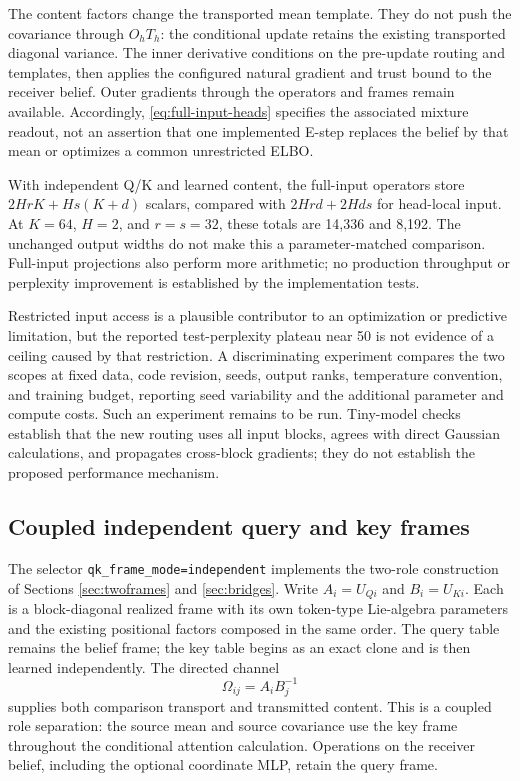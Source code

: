 \documentclass[11pt,letterpaper]{article}
\theoremstyle{remark}
\begin{document}
The content factors change the transported mean template. They do not push the covariance through $O_hT_h$: the conditional update retains the existing transported diagonal variance. The inner derivative conditions on the pre-update routing and templates, then applies the configured natural gradient and trust bound to the receiver belief. Outer gradients through the operators and frames remain available. Accordingly, \eqref{eq:full-input-heads} specifies the associated mixture readout, not an assertion that one implemented E-step replaces the belief by that mean or optimizes a common unrestricted ELBO.

With independent Q/K and learned content, the full-input operators store $2HrK+Hs(K+d)$ scalars, compared with $2Hrd+2Hds$ for head-local input. At $K=64$, $H=2$, and $r=s=32$, these totals are 14,336 and 8,192. The unchanged output widths do not make this a parameter-matched comparison. Full-input projections also perform more arithmetic; no production throughput or perplexity improvement is established by the implementation tests.

Restricted input access is a plausible contributor to an optimization or predictive limitation, but the reported test-perplexity plateau near 50 is not evidence of a ceiling caused by that restriction. A discriminating experiment compares the two scopes at fixed data, code revision, seeds, output ranks, temperature convention, and training budget, reporting seed variability and the additional parameter and compute costs. Such an experiment remains to be run. Tiny-model checks establish that the new routing uses all input blocks, agrees with direct Gaussian calculations, and propagates cross-block gradients; they do not establish the proposed performance mechanism.


\subsection{Coupled independent query and key frames}
\label{sec:implemented-role-frames}
The selector \texttt{qk\_frame\_mode=independent} implements the two-role construction of Sections \ref{sec:twoframes} and \ref{sec:bridges}. Write $A_i=U_{Qi}$ and $B_i=U_{Ki}$. Each is a block-diagonal realized frame with its own token-type Lie-algebra parameters and the existing positional factors composed in the same order. The query table remains the belief frame; the key table begins as an exact clone and is then learned independently. The directed channel
\begin{equation}
 \Omega_{ij}=A_iB_j^{-1}
\end{equation}
supplies both comparison transport and transmitted content. This is a coupled role separation: the source mean and source covariance use the key frame throughout the conditional attention calculation. Operations on the receiver belief, including the optional coordinate MLP, retain the query frame.
\end{document}
